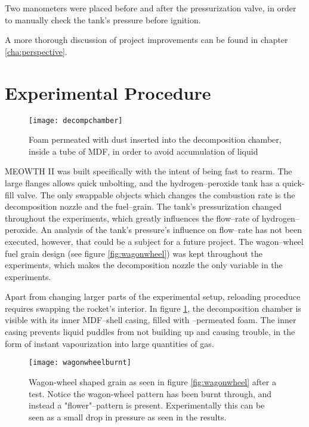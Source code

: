 	Two manometers were placed before and after the pressurization valve, in order to manually check the tank's pressure before ignition.

	A more thorough discussion of project improvements can be found in chapter \ref{cha:perspective}.

	\section{Experimental Procedure}

	\begin{figure}
		\centering
		\texttt{[image: decompchamber]}
		\caption{Foam permeated with  dust inserted into the decomposition chamber, inside a tube of MDF, in order to avoid accumulation of liquid }
		\label{fig:kmno4foam2}
	\end{figure}

	MEOWTH II was built specifically with the intent of being fast to rearm. The large flanges allows quick unbolting, and the hydrogen--peroxide tank has a quick-fill valve. The only swappable objects which changes the combustion rate is the decomposition nozzle and the fuel--grain. The tank's pressurization changed throughout the experiments, which greatly influences the flow--rate of hydrogen--peroxide. An analysis of the tank's pressure's influence on flow--rate has not been executed, however, that could be a subject for a future project. The wagon--wheel fuel grain design (see figure \ref{fig:wagonwheel}) was kept throughout the experiments, which makes the decomposition nozzle the only variable in the experiments.

	Apart from changing larger parts of the experimental setup, reloading proceduce requires swapping the rocket's interior. In figure \ref{fig:kmno4foam2}, the decomposition chamber is visible with its inner MDF--shell casing, filled with --permeated foam. The inner casing prevents liquid puddles from not building up and causing trouble, in the form of instant vapourization into large quantities of gas.

	\begin{figure}
		\centering
		\texttt{[image: wagonwheelburnt]}
		\caption{Wagon-wheel shaped grain as seen in figure \ref{fig:wagonwheel} after a test. Notice the wagon-wheel pattern has been burnt through, and instead a "flower"--pattern is present. Experimentally this can be seen as a small drop in pressure as seen in the results.}
		\label{fig:burntgrain}
	\end{figure}

